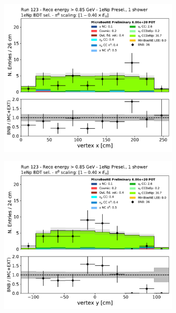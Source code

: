 \begin{figure}[H]
    \centering
    \begin{subfigure}{0.3\textwidth}
    \includegraphics[width=1.0\textwidth]{Sidebands/Figures/1eNp/HighEnergy/HiEext_NPOneShr_NPBDT_pi0e040/reco_nu_vtx_x.pdf}
    \caption{}
    \end{subfigure}
    \begin{subfigure}{0.3\textwidth}
    \includegraphics[width=1.0\textwidth]{Sidebands/Figures/1eNp/HighEnergy/HiEext_NPOneShr_NPBDT_pi0e040/reco_nu_vtx_y.pdf}

\end{subfigure}
\end{figure}
